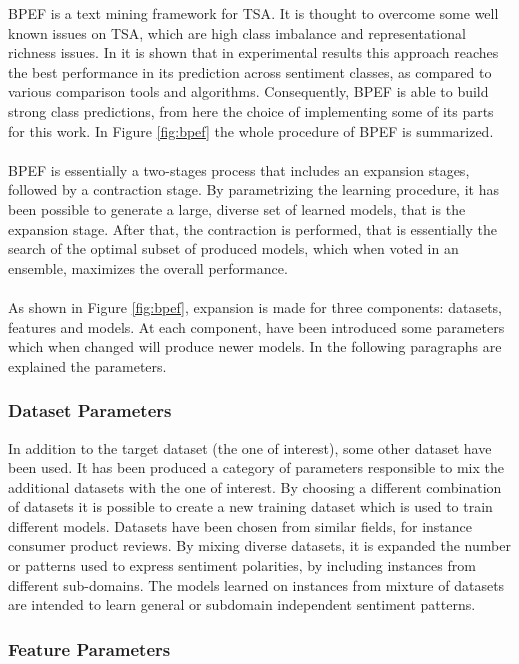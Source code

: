 \ac{BPEF} \cite{Hassan2013TwitterSA} is a text mining framework for \acl{TSA}. It is thought to overcome some well known issues on \ac{TSA}, which are high class imbalance and representational richness issues. In \cite{Zimbra:2018:STS:3210372.3185045} it is shown that in experimental results this approach reaches the best performance in its prediction across sentiment classes, as compared to various comparison tools and algorithms. Consequently, \ac{BPEF} is able to build strong class predictions, from here the choice of implementing some of its parts for this work. In Figure \ref{fig:bpef} the whole procedure of \ac{BPEF} is summarized.\\
\\
\ac{BPEF} is essentially a two-stages process that includes an expansion stages, followed by a contraction stage. By parametrizing the learning procedure, it has been possible to generate a large, diverse set of learned models, that is the expansion stage. After that, the contraction is performed, that is essentially the search of the optimal subset of produced models, which when voted in an ensemble, maximizes the overall performance.\\
\\
As shown in Figure \ref{fig:bpef}, expansion is made for three components: datasets, features and models. At each component, have been introduced some parameters which when changed will produce newer models. In the following paragraphs are explained the parameters.

\subsubsection{Dataset Parameters}

In addition to the target dataset (the one of interest), some other dataset have been used. It has been produced a category of parameters responsible to mix the additional datasets with the one of interest. By choosing a different combination of datasets it is possible to create a new training dataset which is used to train different models. Datasets have been chosen from similar fields, for instance consumer product reviews. By mixing diverse datasets, it is expanded the number or patterns used to express sentiment polarities, by including instances from different sub-domains. The models learned on instances from mixture of datasets are intended to learn general or subdomain independent sentiment patterns.

\subsubsection{Feature Parameters}

